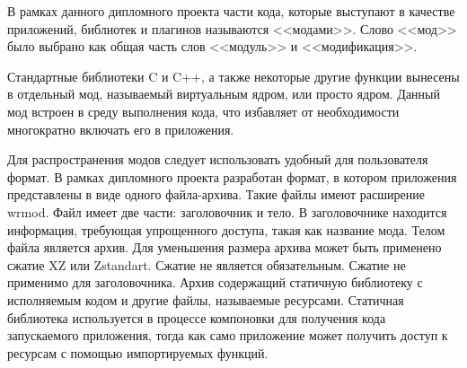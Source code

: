 В рамках данного дипломного проекта части кода, которые выступают в качестве приложений, библиотек и плагинов называются <<модами>>. 
Слово <<мод>> было выбрано как общая часть слов <<модуль>> и <<модификация>>.

Стандартные библиотеки C и C++, а также некоторые другие функции вынесены в отдельный мод, называемый виртуальным ядром, или просто ядром.
Данный мод встроен в среду выполнения кода, что избавляет от необходимости многократно включать его в приложения.

Для распространения модов следует использовать удобный для пользователя формат.
В рамках дипломного проекта разработан формат, в котором приложения представлены в виде одного файла-архива.
Такие файлы имеют расширение wrmod.
Файл имеет две части: заголовочник и тело.
В заголовочнике находится информация, требующая упрощенного доступа, такая как название мода.
Телом файла является архив.
Для уменьшения размера архива может быть применено сжатие XZ или Zstandart.
Сжатие не является обязательным.
Сжатие не применимо для заголовочника.
Архив содержащий статичную библиотеку с исполняемым кодом и другие файлы, называемые ресурсами.
Статичная библиотека используется в процессе компоновки для получения кода запускаемого приложения, тогда как само приложение может получить доступ к ресурсам с помощью импортируемых функций.
